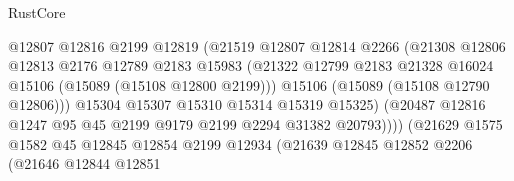 \begin{lexlean}{RustCore}
\begin{coremodule}
                                      @12807
                                      @12816
                                      @2199
                                      @12819
                                      (@21519
                                        @12807
                                        @12814
                                        @2266
                                        (@21308
                                          @12806
                                          @12813
                                          @2176
                                          @12789
                                          @2183
                                          @15983
                                          (@21322
                                            @12799
                                            @2183
                                            @21328
                                            @16024
                                            @15106
                                            (@15089 (@15108 @12800 @2199)))
                                          @15106
                                          (@15089 (@15108 @12790 @12806)))
                                        @15304
                                        @15307
                                        @15310
                                        @15314
                                        @15319
                                        @15325)
                                      (@20487
                                        @12816
                                        @1247
                                        @95
                                        @45
                                        @2199
                                        @9179
                                        @2199
                                        @2294
                                        @31382
                                        @20793))))
                                (@21629
                                  @1575
                                  @1582
                                  @45
                                  @12845
                                  @12854
                                  @2199
                                  @12934
                                  (@21639
                                    @12845
                                    @12852
                                    @2206
                                    (@21646
                                      @12844
                                      @12851

\end{coremodule}
\end{lexlean}
